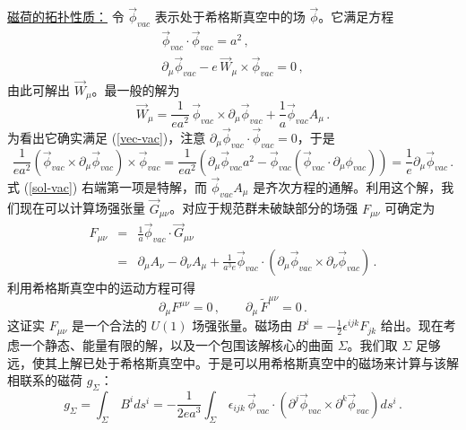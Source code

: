 \noindent\underline{磁荷的拓扑性质：}
\noindent 令 $\vec{\phi}_{vac}$ 表示处于希格斯真空中的场 $\vec{\phi}$。它满足方程
\begin{eqnarray}
&\vec{\phi}_{vac}\cdot\vec{\phi}_{vac} = a^2\,, &\nonumber \\
&\partial_{\mu} \vec{\phi}_{vac}-e\,\vec{W}_{\mu} \times
\vec{\phi}_{vac} = 0\,,& 
\label{vec-vac}
\end{eqnarray}
由此可解出 $\vec{W}_\mu$。最一般的解为
\begin{equation}
\vec{W}_{\mu} = \frac{1}{ea^{2}}\, \vec{\phi}_{vac} \times
\partial_\mu\vec{\phi}_{vac}+\frac{1}{a}\vec{\phi}_{vac}A_{\mu}\,.
\label{sol-vac}
\end{equation}
为看出它确实满足 (\ref{vec-vac})，注意 $\partial_\mu\vec{\phi}_{vac}\cdot\vec{\phi}_{vac}=0$，于是
$$
\frac{1}{ea^2}(\vec{\phi}_{vac}\times\partial_{\mu}\vec{\phi}_{vac})
\times \vec{\phi}_{vac}= \frac{1}{ea^2}\left(\partial_\mu\vec{\phi}_{vac}a^2
-\vec{\phi}_{vac} (\vec{\phi}_{vac}\cdot\partial_\mu\phi_{vac})\right)= 
\frac{1}{e}\partial_\mu\vec{\phi}_{vac}\,.
$$
式 (\ref{sol-vac}) 右端第一项是特解，而 $\vec{\phi}_{vac}A_\mu$ 是齐次方程的通解。利用这个解，我们现在可以计算场强张量 $\vec{G}_{\mu\nu}$。对应于规范群未破缺部分的场强 $F_{\mu\nu}$ 可确定为
\begin{eqnarray}
F_{\mu\nu}&=&\frac{1}{a}\vec{\phi}_{vac}\cdot\vec{G}_{\mu \nu}
\nonumber\\
&=&\partial_\mu A_\nu -\partial_\nu A_\mu +
\frac{1}{a^3 e}\vec{\phi}_{vac}\cdot (\partial_\mu\vec{\phi}_{vac}
\times\partial_\nu\vec{\phi}_{vac})\,.
\label{F-vac}
\end{eqnarray}
利用希格斯真空中的运动方程可得
$$
\partial_\mu F^{\mu\nu}=0\,,\qquad \partial_\mu\,\widetilde F^{\mu\nu}=0\,.
$$
这证实 $F_{\mu\nu}$ 是一个合法的 $U(1)$ 场强张量。磁场由 $B^i=-\frac{1}{2}\epsilon^{ijk}F_{jk}$ 给出。现在考虑一个静态、能量有限的解，以及一个包围该解核心的曲面 $\Sigma$。我们取 $\Sigma$ 足够远，使其上解已处于希格斯真空中。于是可以用希格斯真空中的磁场来计算与该解相联系的磁荷 $g_\Sigma$：
\begin{equation}
g_\Sigma=\int_\Sigma\,B^i ds^i=-\frac{1}{2 ea^3} \int_\Sigma\, 
\epsilon_{ijk}\,\vec{\phi}_{vac}\cdot \left(\partial^j\vec{\phi}_{vac}
\times\partial^k\vec{\phi}_{vac}\right)ds^i\,.
\label{XL}
\end{equation}
